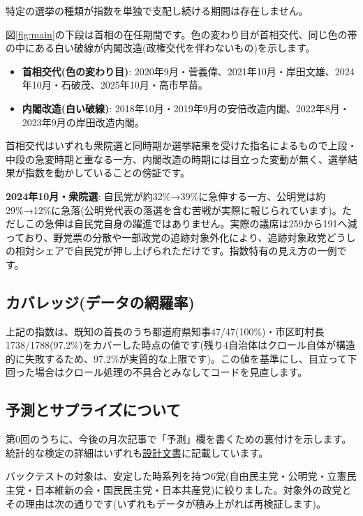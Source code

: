 \documentclass[a4paper,11pt]{ltjsarticle}
\begin{document}
特定の選挙の種類が指数を単独で支配し続ける期間は存在しません。

図\ref{fig:main}の下段は首相の在任期間です。色の変わり目が首相交代、同じ色の帯の中にある白い破線が内閣改造(政権交代を伴わないもの)を示します。

\begin{itemize}
\item \textbf{首相交代(色の変わり目)}: 2020年9月・菅義偉、2021年10月・岸田文雄、2024年10月・石破茂、2025年10月・高市早苗。
\item \textbf{内閣改造(白い破線)}: 2018年10月・2019年9月の安倍改造内閣、2022年8月・2023年9月の岸田改造内閣。
\end{itemize}

首相交代はいずれも衆院選と同時期か選挙結果を受けた指名によるもので上段・中段の急変時期と重なる一方、内閣改造の時期には目立った変動が無く、選挙結果が指数を動かしていることの傍証です。

\textbf{2024年10月・衆院選}: 自民党が約32\%→39\%に急伸する一方、公明党は約29\%→12\%に急落(公明党代表の落選を含む苦戦が実際に報じられています)。ただしこの急伸は自民党自身の躍進ではありません。実際の議席は259から191へ減っており、野党票の分散や一部政党の追跡対象外化により、追跡対象政党どうしの相対シェアで自民党が押し上げられただけです。指数特有の見え方の一例です。

\subsection*{カバレッジ(データの網羅率)}

上記の指数は、既知の首長のうち都道府県知事47/47(100\%)・市区町村長1738/1788(97.2\%)をカバーした時点の値です(残り4自治体はクロール自体が構造的に失敗するため、97.2\%が実質的な上限です)。この値を基準にし、目立って下回った場合はクロール処理の不具合とみなしてコードを見直します。

\subsection*{予測とサプライズについて}

第0回のうちに、今後の月次記事で「予測」欄を書くための裏付けを示します。統計的な検定の詳細はいずれも\href{https://github.com/hiromichikimura-lang/seiryoku-shisu/blob/master/design_document.pdf}{設計文書}に記載しています。

バックテストの対象は、安定した時系列を持つ6党(自由民主党・公明党・立憲民主党・日本維新の会・国民民主党・日本共産党)に絞りました。対象外の政党とその理由は次の通りです(いずれもデータが積み上がれば再検証します)。
\end{document}
